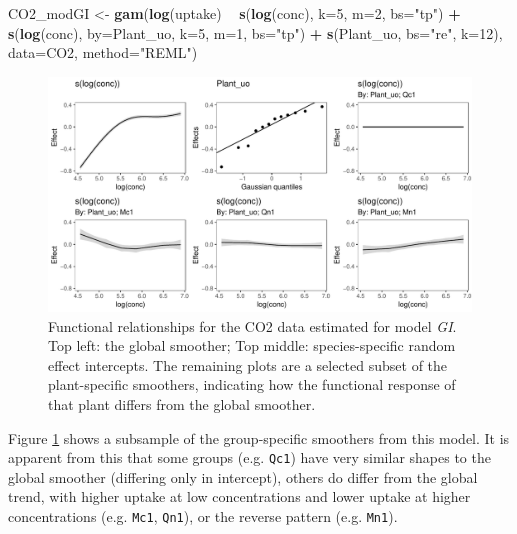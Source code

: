 \documentclass[12pt]{article}
\newenvironment{Shaded}{\begin{snugshade}}{\end{snugshade}}
\newcommand{\KeywordTok}[1]{\textcolor[rgb]{0.13,0.29,0.53}{\textbf{#1}}}
\newcommand{\DataTypeTok}[1]{\textcolor[rgb]{0.13,0.29,0.53}{#1}}
\newcommand{\DecValTok}[1]{\textcolor[rgb]{0.00,0.00,0.81}{#1}}
\newcommand{\StringTok}[1]{\textcolor[rgb]{0.31,0.60,0.02}{#1}}
\newcommand{\OperatorTok}[1]{\textcolor[rgb]{0.81,0.36,0.00}{\textbf{#1}}}
\newcommand{\NormalTok}[1]{#1}
\begin{document}
\begin{Shaded}
\begin{Highlighting}[]
\NormalTok{CO2_modGI <-}\StringTok{ }\KeywordTok{gam}\NormalTok{(}\KeywordTok{log}\NormalTok{(uptake) }\OperatorTok{~}\StringTok{ }\KeywordTok{s}\NormalTok{(}\KeywordTok{log}\NormalTok{(conc), }\DataTypeTok{k=}\DecValTok{5}\NormalTok{, }\DataTypeTok{m=}\DecValTok{2}\NormalTok{, }\DataTypeTok{bs=}\StringTok{"tp"}\NormalTok{) }\OperatorTok{+}
\StringTok{                  }\KeywordTok{s}\NormalTok{(}\KeywordTok{log}\NormalTok{(conc), }\DataTypeTok{by=}\NormalTok{Plant_uo, }\DataTypeTok{k=}\DecValTok{5}\NormalTok{, }\DataTypeTok{m=}\DecValTok{1}\NormalTok{, }\DataTypeTok{bs=}\StringTok{"tp"}\NormalTok{) }\OperatorTok{+}
\StringTok{                  }\KeywordTok{s}\NormalTok{(Plant_uo, }\DataTypeTok{bs=}\StringTok{"re"}\NormalTok{, }\DataTypeTok{k=}\DecValTok{12}\NormalTok{),}
                \DataTypeTok{data=}\NormalTok{CO2, }\DataTypeTok{method=}\StringTok{"REML"}\NormalTok{)}
\end{Highlighting}
\end{Shaded}

\begin{figure}
\centering
\includegraphics{../figures/modGI_CO2-1.pdf}
\caption{\label{fig:co2_modGI}Functional relationships for the CO2 data
estimated for model \emph{GI}. Top left: the global smoother; Top
middle: species-specific random effect intercepts. The remaining plots
are a selected subset of the plant-specific smoothers, indicating how
the functional response of that plant differs from the global smoother.}
\end{figure}

Figure \ref{fig:co2_modGI} shows a subsample of the group-specific
smoothers from this model. It is apparent from this that some groups
(e.g. \texttt{Qc1}) have very similar shapes to the global smoother
(differing only in intercept), others do differ from the global trend,
with higher uptake at low concentrations and lower uptake at higher
concentrations (e.g. \texttt{Mc1}, \texttt{Qn1}), or the reverse pattern
(e.g. \texttt{Mn1}).
\end{document}
